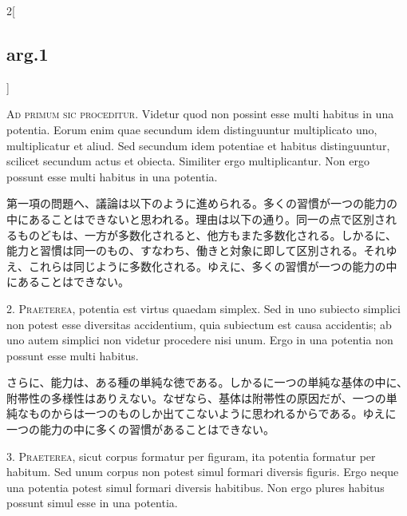 \documentclass[paper=a4paper,fontsize=10pt,jafontsize=9pt,titlepage]{jlreq}
\begin{document}
\begin{paracol}{2}[\subsection{arg.1}]

{\scshape Ad primum sic proceditur}. Videtur quod non possint esse
multi habitus in una potentia. Eorum enim quae secundum idem
distinguuntur multiplicato uno, multiplicatur et aliud. Sed secundum
idem potentiae et habitus distinguuntur, scilicet secundum actus et
obiecta. Similiter ergo multiplicantur. Non ergo possunt esse multi
habitus in una potentia.

\switchcolumn

第一項の問題へ、議論は以下のように進められる。多くの習慣が一つの能力の
中にあることはできないと思われる。理由は以下の通り。同一の点で区別され
るものどもは、一方が多数化されると、他方もまた多数化される。しかるに、
能力と習慣は同一のもの、すなわち、働きと対象に即して区別される。それゆ
え、これらは同じように多数化される。ゆえに、多くの習慣が一つの能力の中
にあることはできない。


2. {\scshape Praeterea}, potentia est virtus quaedam simplex. Sed in
uno subiecto simplici non potest esse diversitas accidentium, quia
subiectum est causa accidentis; ab uno autem simplici non videtur
procedere nisi unum. Ergo in una potentia non possunt esse multi
habitus.

\switchcolumn

さらに、能力は、ある種の単純な徳である。しかるに一つの単純な基体の中に、
附帯性の多様性はありえない。なぜなら、基体は附帯性の原因だが、一つの単
純なものからは一つのものしか出てこないように思われるからである。ゆえに
一つの能力の中に多くの習慣があることはできない。


3. {\scshape Praeterea}, sicut corpus formatur per figuram, ita
potentia formatur per habitum. Sed unum corpus non potest simul
formari diversis figuris. Ergo neque una potentia potest simul formari
diversis habitibus. Non ergo plures habitus possunt simul esse in una
potentia.


\end{paracol}
\end{document}
